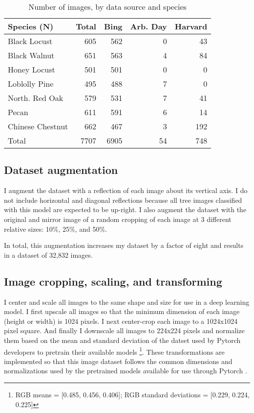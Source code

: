 \documentclass[10pt,twocolumn,letterpaper]{article}
\begin{document}
\begin{table}[!htbp]
   \begin{center}
    \small
   \begin{tabular}{|l|r|r|r|r|}
   \hline
   Species (N) & Total & Bing & Arb. Day & Harvard \\
   \hline\hline
   Black Locust & 605 & 562 & 0 & 43\\
    Black Walnut & 651 & 563 & 4 & 84\\
    Honey Locust & 501 & 501 & 0 & 0\\
    Loblolly Pine & 495 & 488 & 7 & 0\\
    North. Red Oak & 579 & 531 & 7 & 41\\
    Pecan & 611 & 591 & 6 & 14\\
    Chinese Chestnut & 662 & 467 & 3 &  192\\
    \hline\hline
    Total & 7707 & 6905 & 54 & 748\\
   \hline
   \end{tabular}
   \end{center}
   \caption{\label{tab:dataset_og} Number of images, by data source and species}
   \end{table}

\subsection{Dataset augmentation}

I augment the dataset with a reflection of each image about its vertical axis. I do not include horizontal and diagonal reflections because all tree images classified with this model are expected to be up-right. I also augment the dataset with the original and mirror image of a random cropping of each image at 3 different relative sizes: 10\%, 25\%, and 50\%. 

In total, this augmentation increases my dataset by a factor of eight and results in a dataset of 32,832 images.

\subsection{Image cropping, scaling, and transforming}

I center and scale all images to the same shape and size for use in a deep learning model. I first upscale all images so that the minimum dimension of each image (height or width) is 1024 pixels. I next center-crop each image to a 1024x1024 pixel square. And finally I downscale all images to 224x224 pixels and normalize them based on the mean and standard deviation of the datset used by Pytorch developers to pretrain their available models \footnote{RGB means = [0.485, 0.456, 0.406]; RGB standard deviations = [0.229, 0.224, 0.225]}. These transformations are implemented so that this image dataset follows the common dimensions and normalizations used by the pretrained models available for use through Pytorch \cite{PyTorch}. 
\end{document}

